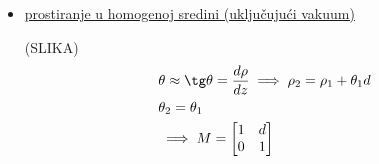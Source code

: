 \documentclass[fleqn]{report}
\begin{document}
\begin{itemize}
    \item \underline{prostiranje u homogenoj sredini (uključujući vakuum)}

          (SLIKA)
          \begin{align*}
               & \theta \approx \tg\theta = \frac{d\rho}{dz} \implies \rho_2 = \rho_1 + \theta_1 d \\
               & \theta_2 = \theta_1                                                               \\
               & \implies M = \begin{bmatrix}
                                  1 & d \\
                                  0 & 1
                              \end{bmatrix}
          \end{align*}


\end{itemize}
\end{document}
